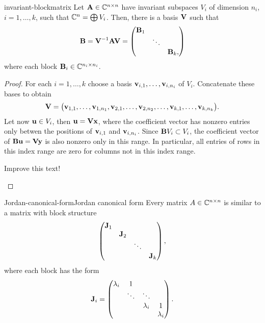 \begin{Lemma}{invariant-blockmatrix}
  Let $\mathbf A\in\mathbb C^{n\times n}$ have invariant subspaces $V_i$ of dimension
  $n_i$, $i=1,\dots,k$, such that $\mathbb C^n= \bigoplus V_i$. Then, there
  is a basis $\mathbf V$ such that
  \begin{gather}
    \mathbf B = \mathbf V^{-1}\mathbf A\mathbf V =
    \begin{pmatrix}
      \mathbf B_1\\&\ddots\\&&\mathbf B_k,
    \end{pmatrix}
  \end{gather}
  where each block $\mathbf B_i\in\mathbb C^{n_i\times n_i}$.
\end{Lemma}

\begin{proof}
  For each $i=1,\dots,k$ choose a basis $\mathbf v_{i,1},\dots,\mathbf v_{i,n_i}$
  of $V_i$. Concatenate these bases to obtain
  \begin{gather}
    \mathbf V = \bigl(\mathbf v_{1,1},\dots,\mathbf v_{1,n_1},\mathbf v_{2,1},\dots,\mathbf v_{2,n_2},\dots,\mathbf v_{k,1},\dots,\mathbf v_{k,n_k}\bigr).
  \end{gather}
  Let now $\mathbf u\in V_i$, then $\mathbf u = \mathbf V\mathbf x$, where the coefficient
  vector has nonzero entries only betwen the positions of $\mathbf v_{i,1}$
  and $\mathbf v_{i,n_i}$. Since $\mathbf B V_i\subset V_i$, the coefficient
  vector of $\mathbf B\mathbf u = \mathbf V\mathbf y$ is also nonzero only in this
  range. In particular, all entries of rows in this index range are
  zero for columns not in this index range.
\begin{todo}
    Improve this text!
\end{todo}
\end{proof}

\begin{Theorem*}{Jordan-canonical-form}{Jordan canonical form}
  Every matrix $A\in\mathbb C^{n\times n}$ is similar to a matrix with block structure
  \begin{gather}
    \begin{pmatrix}
      \mathbf J_1\\&\mathbf J_2\\&&\ddots\\&&&\mathbf J_k
    \end{pmatrix},
  \end{gather}
  where each block has the form
  \begin{gather}
    \mathbf J_i = \begin{pmatrix}
      \lambda_i&1\\&\ddots&\ddots\\
      &&\lambda_i&1\\
      &&&\lambda_i
    \end{pmatrix}.
  \end{gather}
\end{Theorem*}


